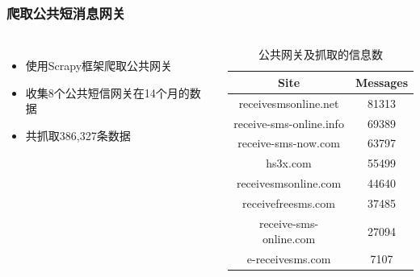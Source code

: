 \documentclass[10pt,aspectratio=43,mathserif]{beamer}
\begin{document}
		\begin{frame}
		  \frametitle{\textbf{爬取公共短消息网关}}
            \begin{columns}
                \footnotesize
                \begin{itemize}
                  \item 使用Scrapy框架爬取公共网关
                  \item 收集8个公共短信网关在14个月的数据
                  \item 共抓取386,327条数据
                \end{itemize}

                \begin{table}
                \caption{公共网关及抓取的信息数}
                \label{table1:gateways}
                \centering
                \footnotesize
                \begin{tabular}{|c|c|}
                \hline
                \textbf{Site}           & \textbf{Messages}\\
                \hline
                receivesmsonline.net    &81313\\
                \hline
                receive-sms-online.info &69389\\
                \hline
                receive-sms-now.com     &63797\\
                \hline
                 hs3x.com               &55499\\
                \hline
                receivesmsonline.com    &44640\\
                \hline
                receivefreesms.com      &37485\\
                \hline
                receive-sms-online.com  &27094\\
                \hline
                 e-receivesms.com       &7107\\
                \hline
                \end{tabular}
                \end{table}
            \end{columns}

		\end{frame}
\end{document}
